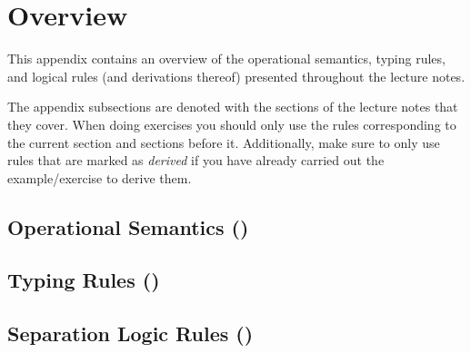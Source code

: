 \newcommand{\appsuffix}{-app}

\section{Overview}
\label{app:overview}

This appendix contains an overview of the operational semantics, typing rules, and
logical rules (and derivations thereof) presented throughout the lecture notes.

The appendix subsections are denoted with the sections of the lecture notes that they cover.
When doing exercises you should only use the rules corresponding to the current section and
sections before it.
Additionally, make sure to only use rules that are marked as \emph{derived} if you have
already carried out the example/exercise to derive them.

\subsection{Operational Semantics ()}

\opsem

\subsection{Typing Rules ()}

{ \typingrules }

\subsection{Separation Logic Rules ()}

